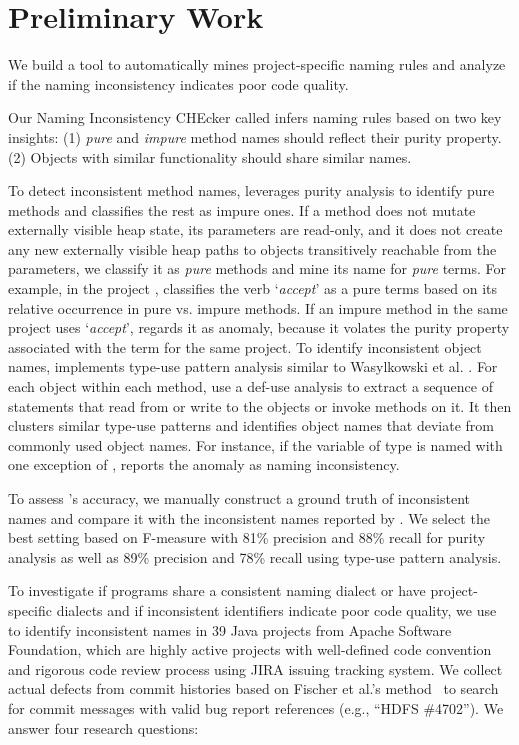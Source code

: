 \section{Preliminary Work}

We build a tool to automatically mines project-specific naming rules and analyze if the naming inconsistency indicates poor code quality. 

Our Naming Inconsistency CHEcker called \niche infers naming rules based on two key insights: (1) {\it pure} and {\it impure} method names should reflect their purity property. (2) Objects with similar functionality should share similar names. 

To detect inconsistent method names, \niche leverages purity analysis to identify pure methods and classifies the rest as impure ones. If a method does not mutate externally visible heap state, its parameters are read-only, and it does not create any new externally visible heap paths to objects transitively reachable from the parameters, we classify it as {\it pure} methods and mine its name for {\it pure} terms.  For example, in the project , \niche classifies the verb `{\it accept}' as a pure terms based on its relative occurrence in pure vs. impure methods. If an impure method in the same project uses `{\it accept}', \niche regards it as anomaly, because it volates the purity property associated with the term for the same project.
To identify inconsistent object names, \niche implements type-use pattern analysis similar to Wasylkowski et al. \/ \cite{zellerfse07:usageAbnormal}. For each object within each method, \niche use a def-use analysis to extract a sequence of statements that read from or write to the objects or invoke methods on it. It then clusters similar type-use patterns and identifies object names that deviate from commonly used object names. For instance, if the variable of type  is named  with one exception of , \niche reports the anomaly as naming inconsistency. 

To assess \niche's accuracy, we manually construct a ground truth of inconsistent names and compare it with the inconsistent names reported by \niche. We select the best setting based on F-measure with 81\% precision and 88\% recall for purity analysis as well as 89\% precision and 78\% recall using type-use pattern analysis.  

To investigate if programs share a consistent naming dialect or have project-specific dialects and if inconsistent identifiers indicate poor code quality, we use \niche to identify inconsistent names in 39 Java projects from Apache Software Foundation, which are highly active projects with well-defined code convention and rigorous code review process using JIRA issuing tracking system. We collect actual defects from commit histories based on Fischer et al.'s method~\cite{Fischer:versionICSM03}  to search for commit messages with valid bug report references (e.g., ``HDFS \#4702'').  We answer four research questions:

